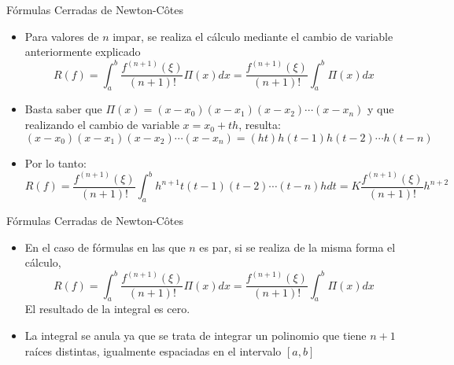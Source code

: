 \documentclass[12pt]{beamer}
\begin{document}
\begin{frame}{F\'ormulas Cerradas de Newton-C\^otes}
  \begin{itemize}
    \item Para valores de $n$ impar, se realiza el cálculo mediante el cambio de variable anteriormente explicado
    $$
    R(f) = \int_{a}^{b}\dfrac{f^{(n+1)}(\xi)}{(n+1)!}\Pi(x)dx = \dfrac{f^{(n+1)}(\xi)}{(n+1)!}\int_{a}^{b}\Pi(x)dx
    $$
    \item<2-> Basta saber que $\Pi(x) = (x-x_0)(x-x_1)(x-x_2)\cdots(x-x_n)$ y que realizando el cambio de variable $x = x_0 + th$, resulta:
    $$
    (x-x_0)(x-x_1)(x-x_2)\cdots(x-x_n) = (ht)h(t-1)h(t-2)\cdots h(t-n)
    $$
    \item<3-> Por lo tanto:
    \footnotesize{
    $$
    R(f) = \dfrac{f^{(n+1)}(\xi)}{(n+1)!}\int_{a}^{b}h^{n+1}t(t-1)(t-2)\cdots (t-n)hdt = K\dfrac{f^{(n+1)}(\xi)}{(n+1)!}h^{n+2}
    $$}
  \end{itemize}
\end{frame}
\begin{frame}{F\'ormulas Cerradas de Newton-C\^otes}
  \begin{itemize}
    \item En el caso de fórmulas en las que $n$ es par, si se realiza de la misma forma el cálculo,
    $$
    R(f) = \int_{a}^{b}\dfrac{f^{(n+1)}(\xi)}{(n+1)!}\Pi(x)dx = \dfrac{f^{(n+1)}(\xi)}{(n+1)!}\int_{a}^{b}\Pi(x)dx
    $$
    El resultado de la integral es cero.
    \item<2-> La integral se anula ya que se trata de integrar un polinomio que tiene $n+1$ raíces distintas, igualmente
    espaciadas en el intervalo $[a,b]$
      \begin{center}  
\end{center}
  \end{itemize}
\end{frame}
\end{document}
